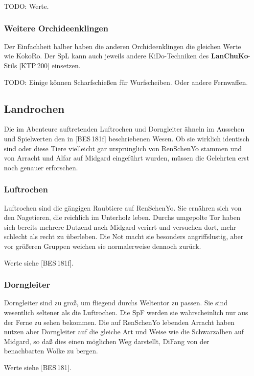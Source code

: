 \documentclass[
a4paper,
twoside,
DIV=calc,
BCOR=4mm,
fontsize=9pt,
twocolumn=on,
titlepage=on,
parskip=half
]{scrartcl}
\begin{document}
TODO: Werte.

\subsubsection{Weitere Orchideenklingen}

Der Einfachheit halber haben die anderen Orchideenklingen die
gleichen Werte wie KokoRo. Der SpL kann auch jeweils andere
KiDo-Techniken des \textbf{LanChuKo}-Stils [KTP\,200] einsetzen.

TODO: Einige können Scharfschießen für Wurfscheiben. Oder andere
Fernwaffen.

\subsection{Landrochen}

Die im Abenteure auftretenden Luftrochen und Dorngleiter ähneln im
Aussehen und Spielwerten den in [BES\,181f] beschriebenen Wesen. Ob
sie wirklich identisch sind oder diese Tiere vielleicht gar
ursprünglich von RenSchenYo stammen und von Arracht und Alfar auf
Midgard eingeführt wurden, müssen die Gelehrten erst noch genauer
erforschen.

\subsubsection{Luftrochen}

Luftrochen sind die gängigen Raubtiere auf RenSchenYo. Sie ernähren
sich von den Nagetieren, die reichlich im Unterholz leben. Durchs
umgepolte Tor haben sich bereits mehrere Dutzend nach Midgard verirrt
und versuchen dort, mehr schlecht als recht zu überleben. Die Not
macht sie besonders angriffslustig, aber vor größeren Gruppen weichen
sie normalerweise dennoch zurück.

Werte siehe [BES\,181f].

\subsubsection{Dorngleiter}

Dorngleiter sind zu groß, um fliegend durchs Weltentor zu passen. Sie
sind wesentlich seltener als die Luftrochen. Die SpF werden sie
wahrscheinlich nur aus der Ferne zu sehen bekommen. Die auf RenSchenYo
lebenden Arracht haben nutzen aber Dorngleiter auf die gleiche Art und
Weise wie die Schwarzalben auf Midgard, so daß dies einen möglichen
Weg darstellt, DiFang von der benachbarten Wolke zu bergen.

Werte siehe [BES\,181].
\end{document}
